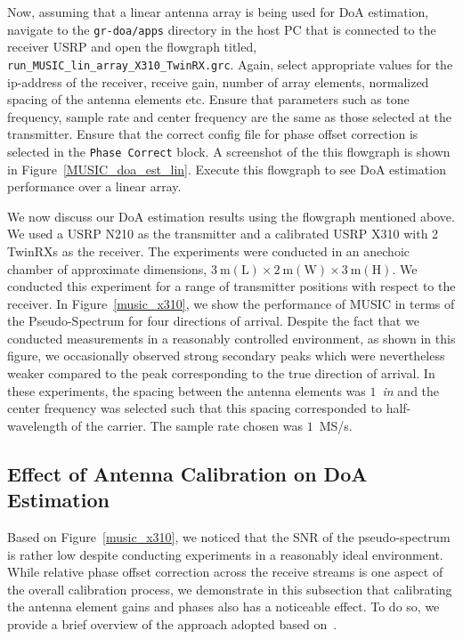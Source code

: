 \documentclass[a4paper, 11pt]{article}
\begin{document}
Now, assuming that a linear antenna array is being used for DoA estimation, navigate to the \texttt{gr-doa/apps} directory in the host PC that is connected to the receiver USRP and open the flowgraph titled, \texttt{run\_MUSIC\_lin\_array\_X310\_TwinRX.grc}. Again, select appropriate values for the ip-address of the receiver, receive gain, number of array elements, normalized spacing of the antenna elements etc. Ensure that parameters such as tone frequency, sample rate and center frequency are the same as those selected at the transmitter. Ensure that the correct config file for phase offset correction is selected in the \texttt{Phase Correct} block. A screenshot of the this flowgraph is shown in Figure~\ref{MUSIC_doa_est_lin}. Execute this flowgraph to see DoA estimation performance over a linear array. 

We now discuss our DoA estimation results using the flowgraph mentioned above. We used a USRP N210 as the transmitter and a calibrated USRP X310 with 2 TwinRXs as the receiver. The experiments were conducted in an anechoic chamber of approximate dimensions, $3~\mathrm{m(L)}\times 2~\mathrm{m(W)}\times 3~\mathrm{m(H)}$. We conducted this experiment for a range of transmitter positions with respect to the receiver. In Figure~\ref{music_x310}, we show the performance of MUSIC in terms of the Pseudo-Spectrum for four directions of arrival. Despite the fact that we conducted measurements in a reasonably controlled environment, as shown in this figure, we occasionally observed strong secondary peaks which were nevertheless weaker compared to the peak corresponding to the true direction of arrival. In these experiments, the spacing between the antenna elements was $1$~\textit{in} and the center frequency was selected such that this spacing corresponded to half-wavelength of the carrier. The sample rate chosen was $1$~MS/s. 

\subsection*{Effect of Antenna Calibration on DoA Estimation}
Based on Figure~\ref{music_x310}, we noticed that the SNR of the pseudo-spectrum is rather low despite conducting experiments in a reasonably ideal environment. While relative phase offset correction across the receive streams is one aspect of the overall calibration process, we demonstrate in this subsection that calibrating the antenna element gains and phases also has a noticeable effect. To do so, we provide a brief overview of the approach adopted based on~\cite{soon1994}. 
\end{document}
